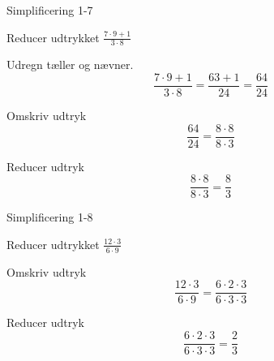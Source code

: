 \documentclass{article}
\begin{document}
\newpage

\begin{exercise}{Simplificering 1-7}

Reducer udtrykket $\frac{7 \cdot 9 + 1}{3 \cdot 8}$


\hint

Udregn tæller og nævner.
\[
\frac{7 \cdot 9 + 1}{3 \cdot 8} = \frac{63+1}{24} = \frac{64}{24}
\]

\hint

Omskriv udtryk 
\[
\frac{64}{24} = \frac{8 \cdot 8}{8 \cdot 3}
\]	

\hint

Reducer udtryk 
\[
\frac{8 \cdot 8}{8 \cdot 3} = \frac{8}{3}
\]

\end{exercise}

\newpage

\begin{exercise}{Simplificering 1-8}

Reducer udtrykket $\frac{12 \cdot 3}{6 \cdot 9}$


\hint

Omskriv udtryk
\[
\frac{12 \cdot 3}{6 \cdot 9} = \frac{6 \cdot 2 \cdot 3}{ 6 \cdot 3 \cdot 3}
\]

\hint

Reducer udtryk 
\[
\frac{6 \cdot 2 \cdot 3}{6 \cdot 3 \cdot 3} = \frac{2}{3} 
\]

\end{exercise}
\end{document}
